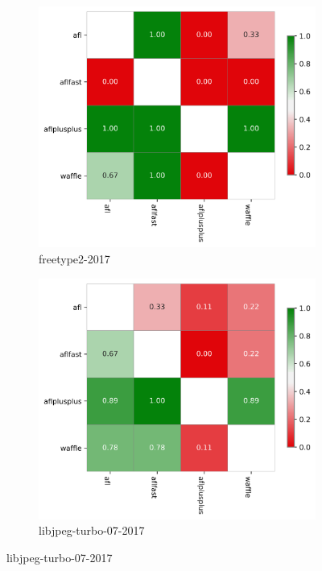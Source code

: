 \begin{figure}
    \centering
    \begin{subfigure}[b]{0.475\linewidth}
        \centering
        \includegraphics[width=0.95\linewidth]{Experiments/freetype2-2017_varga_delaney_a12_plot.png}
        \caption{freetype2-2017}
        \label{fig:sub:freetype-vda12}
    \end{subfigure}
    \begin{subfigure}[b]{0.475\linewidth}
        \centering
        \includegraphics[width=0.95\linewidth]{Experiments/libjpeg-turbo-07-2017_varga_delaney_a12_plot.png}
        \caption{libjpeg-turbo-07-2017}
        \label{fig:sub:libjpeg-vda12}
    \end{subfigure}


\end{figure}
